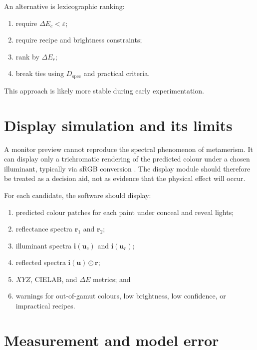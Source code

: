 \documentclass[11pt,a4paper]{article}
\newcommand{\vect}[1]{\boldsymbol{#1}}
\newcommand{\hadamard}{\odot}
\newcommand{\DE}{\Delta E}
\begin{document}
An alternative is lexicographic ranking:
\begin{enumerate}
  \item require $\DE_c<\varepsilon$;
  \item require recipe and brightness constraints;
  \item rank by $\DE_r$;
  \item break ties using $D_{\mathrm{spec}}$ and practical criteria.
\end{enumerate}
This approach is likely more stable during early experimentation.

\section{Display simulation and its limits}

A monitor preview cannot reproduce the spectral phenomenon of metamerism. It can display only a trichromatic rendering of the predicted colour under a chosen illuminant, typically via sRGB conversion \citep{IEC61966}. The display module should therefore be treated as a decision aid, not as evidence that the physical effect will occur.

For each candidate, the software should display:
\begin{enumerate}
  \item predicted colour patches for each paint under conceal and reveal lights;
  \item reflectance spectra $\vect{r}_1$ and $\vect{r}_2$;
  \item illuminant spectra $\vect{i}(\vect{u}_c)$ and $\vect{i}(\vect{u}_r)$;
  \item reflected spectra $\vect{i}(\vect{u})\hadamard\vect{r}$;
  \item $XYZ$, CIELAB, and $\DE$ metrics; and
  \item warnings for out-of-gamut colours, low brightness, low confidence, or impractical recipes.
\end{enumerate}

\section{Measurement and model error}
\end{document}
